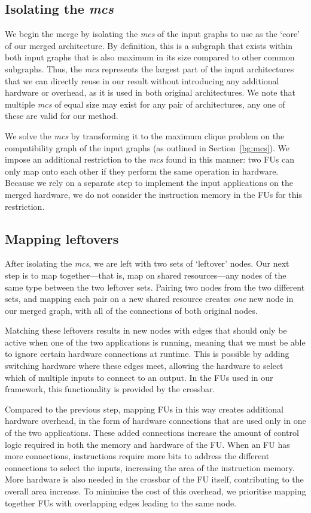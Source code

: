 \subsection{Isolating the \textit{mcs}}
We begin the merge by isolating the \textit{mcs} of the input graphs to use as the `core' of our merged architecture. By definition, this is a subgraph that exists within both input graphs that is also maximum in its size compared to other common subgraphs. Thus, the \textit{mcs} represents the largest part of the input architectures that we can directly reuse in our result without introducing any additional hardware or overhead, as it is used in both original architectures. We note that multiple \textit{mcs} of equal size may exist for any pair of architectures, any one of these are valid for our method.

We solve the \textit{mcs} by transforming it to the maximum clique problem on the compatibility graph of the input graphs (as outlined in Section~\ref{bg:mcs}). We impose an additional restriction to the \textit{mcs} found in this manner: two FUs can only map onto each other if they perform the same operation in hardware. Because we rely on a separate step to implement the input applications on the merged hardware, we do not consider the instruction memory in the FUs for this restriction.

\subsection{Mapping leftovers}
After isolating the \textit{mcs}, we are left with two sets of `leftover' nodes. Our next step is to map together---that is, map on shared resources---any nodes of the same type between the two leftover sets. Pairing two nodes from the two different sets, and mapping each pair on a new shared resource creates \textit{one} new node in our merged graph, with all of the connections of both original nodes.

Matching these leftovers results in new nodes with edges that should only be active when one of the two applications is running, meaning that we must be able to ignore certain hardware connections at runtime. This is possible by adding switching hardware where these edges meet, allowing the hardware to select which of multiple inputs to connect to an output. In the FUs used in our framework, this functionality is provided by the crossbar.

Compared to the previous step, mapping FUs in this way creates additional hardware overhead, in the form of hardware connections that are used only in one of the two applications. These added connections increase the amount of control logic required in both the memory and hardware of the FU. When an FU has more connections, instructions require more bits to address the different connections to select the inputs, increasing the area of the instruction memory. More hardware is also needed in the crossbar of the FU itself, contributing to the overall area increase. To minimise the cost of this overhead, we prioritise mapping together FUs with overlapping edges leading to the same node.

